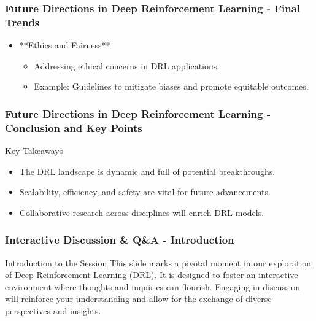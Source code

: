 \documentclass[aspectratio=169]{beamer}
\begin{document}
\begin{frame}[fragile]
    \frametitle{Future Directions in Deep Reinforcement Learning - Final Trends}
    \begin{itemize}
        \item **Ethics and Fairness**
            \begin{itemize}
                \item Addressing ethical concerns in DRL applications.
                \item Example: Guidelines to mitigate biases and promote equitable outcomes.
            \end{itemize}
    \end{itemize}
\end{frame}

\begin{frame}[fragile]
    \frametitle{Future Directions in Deep Reinforcement Learning - Conclusion and Key Points}
    \begin{block}{Key Takeaways}
        \begin{itemize}
            \item The DRL landscape is dynamic and full of potential breakthroughs.
            \item Scalability, efficiency, and safety are vital for future advancements.
            \item Collaborative research across disciplines will enrich DRL models.
        \end{itemize}
    \end{block}
\end{frame}

\begin{frame}[fragile]
  \frametitle{Interactive Discussion \& Q\&A - Introduction}
  \begin{block}{Introduction to the Session}
    This slide marks a pivotal moment in our exploration of Deep Reinforcement Learning (DRL). 
    It is designed to foster an interactive environment where thoughts and inquiries can flourish. 
    Engaging in discussion will reinforce your understanding and allow for the exchange of diverse perspectives and insights.
  \end{block}
\end{frame}
\end{document}
